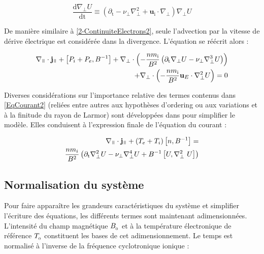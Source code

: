\begin{refsection}
\begin{equation}
\frac{\text{d}\nabla_\perp U}{\text{dt}} \equiv 
\left(\partial_\text{t} - \nu_\perp \nabla_\perp^2 +
\mathbf{u}_\text{i}\cdot\nabla_\perp\right)\nabla_\perp U
\end{equation}

De manière similaire à \eqref{2-ContinuiteElectrons2}, seule l'advection par
la vitesse de dérive électrique est considérée dans la divergence.
L'équation  se réécrit alors :

\begin{equation}\begin{split}
\label{EqCourant2}
\nabla_\para\cdot\mathbf{j}_\para + \left[P_i+P_e,B\puissance{-1}\right] +
\nabla_\perp\cdot\left(-\frac{nm_\text{i}}{B^2}\left(\partial_\text{t}\nabla_\perp
U - \nu_\perp \nabla_\perp^3 U \right)\right) \\+
\nabla_\perp\cdot\left(-\frac{nm_\text{i}}{B^2}\mathbf{u}_E\cdot\nabla_\perp^2
U\right)=0
\end{split}
\end{equation}

Diverses considérations sur l'importance relative des termes contenus dans
\eqref{EqCourant2} (reliées entre autres aux hypothèses d'ordering
ou aux variations et à la finitude du rayon de Larmor) sont développées dans
\cite{Sarazin} pour simplifier le modèle. Elles conduisent à l'expression
finale de l'équation du courant :

\begin{equation}\begin{split}
\label{2-eqCourantFinale}
\nabla_\para\cdot\mathbf{j}_\para +
(T_e+T_i)\left[n,B\puissance{-1}\right] =\\
\frac{nm_i}{B^2}\left(\partial_\text{t}\nabla_\perp^2 U - \nu_\perp
\nabla_\perp^4U+
B\puissance{-1}\left[U,\nabla_\perp^2\ U\right]\right)
\end{split}
\end{equation}

\subsection{Normalisation du système}
Pour faire apparaître les grandeurs caractéristiques du système et simplifier
l'écriture des équations, les différents termes sont
maintenant adimensionnées. L'intensité du champ
magnétique $B_{_{0}}$ et à la température électronique de référence
$T_{_{0}}$ constituent les bases de cet adimensionnement. Le temps est
normalisé à l'inverse de la fréquence cyclotronique ionique :


\end{refsection}
